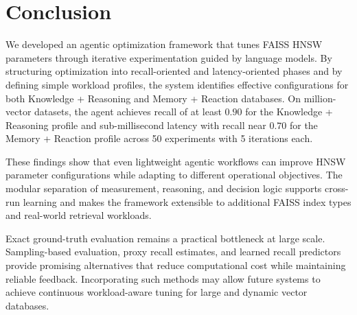 \documentclass{article}
\begin{document}
\section{Conclusion}

We developed an agentic optimization framework that tunes FAISS HNSW parameters through iterative
experimentation guided by language models. By structuring optimization into recall-oriented and
latency-oriented phases and by defining simple workload profiles, the system identifies effective
configurations for both Knowledge + Reasoning and Memory + Reaction databases. On million-vector
datasets, the agent achieves recall of at least $0.90$ for the Knowledge + Reasoning profile and
sub-millisecond latency with recall near $0.70$ for the Memory + Reaction profile across 50
experiments with 5 iterations each.

These findings show that even lightweight agentic workflows can improve HNSW parameter
configurations while adapting to different operational objectives. The modular separation of
measurement, reasoning, and decision logic supports cross-run learning and makes the framework
extensible to additional FAISS index types and real-world retrieval workloads.

Exact ground-truth evaluation remains a practical bottleneck at large scale. Sampling-based
evaluation, proxy recall estimates, and learned recall predictors provide promising alternatives that
reduce computational cost while maintaining reliable feedback. Incorporating such methods may allow
future systems to achieve continuous workload-aware tuning for large and dynamic vector databases.



\end{document}
